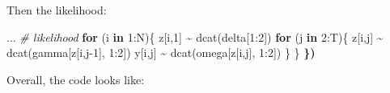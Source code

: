 \documentclass[
  12pt,
]{krantz}
\newenvironment{Shaded}{\begin{snugshade}}{\end{snugshade}}
\newcommand{\CommentTok}[1]{\textcolor[rgb]{0.56,0.35,0.01}{\textit{#1}}}
\newcommand{\ControlFlowTok}[1]{\textcolor[rgb]{0.13,0.29,0.53}{\textbf{#1}}}
\newcommand{\DecValTok}[1]{\textcolor[rgb]{0.00,0.00,0.81}{#1}}
\newcommand{\ErrorTok}[1]{\textcolor[rgb]{0.64,0.00,0.00}{\textbf{#1}}}
\newcommand{\FunctionTok}[1]{\textcolor[rgb]{0.00,0.00,0.00}{#1}}
\newcommand{\NormalTok}[1]{#1}
\newcommand{\SpecialCharTok}[1]{\textcolor[rgb]{0.00,0.00,0.00}{#1}}
\begin{document}
Then the likelihood:

\begin{Shaded}
\begin{Highlighting}[]
\NormalTok{...}
    \CommentTok{\# likelihood}
    \ControlFlowTok{for}\NormalTok{ (i }\ControlFlowTok{in} \DecValTok{1}\SpecialCharTok{:}\NormalTok{N)\{}
\NormalTok{    z[i,}\DecValTok{1}\NormalTok{] }\SpecialCharTok{\textasciitilde{}} \FunctionTok{dcat}\NormalTok{(delta[}\DecValTok{1}\SpecialCharTok{:}\DecValTok{2}\NormalTok{])}
    \ControlFlowTok{for}\NormalTok{ (j }\ControlFlowTok{in} \DecValTok{2}\SpecialCharTok{:}\NormalTok{T)\{}
\NormalTok{      z[i,j] }\SpecialCharTok{\textasciitilde{}} \FunctionTok{dcat}\NormalTok{(gamma[z[i,j}\DecValTok{{-}1}\NormalTok{], }\DecValTok{1}\SpecialCharTok{:}\DecValTok{2}\NormalTok{])}
\NormalTok{      y[i,j] }\SpecialCharTok{\textasciitilde{}} \FunctionTok{dcat}\NormalTok{(omega[z[i,j], }\DecValTok{1}\SpecialCharTok{:}\DecValTok{2}\NormalTok{])}
\NormalTok{    \}}
\NormalTok{  \}}
\ErrorTok{\})}
\end{Highlighting}
\end{Shaded}

Overall, the code looks like:
\end{document}
